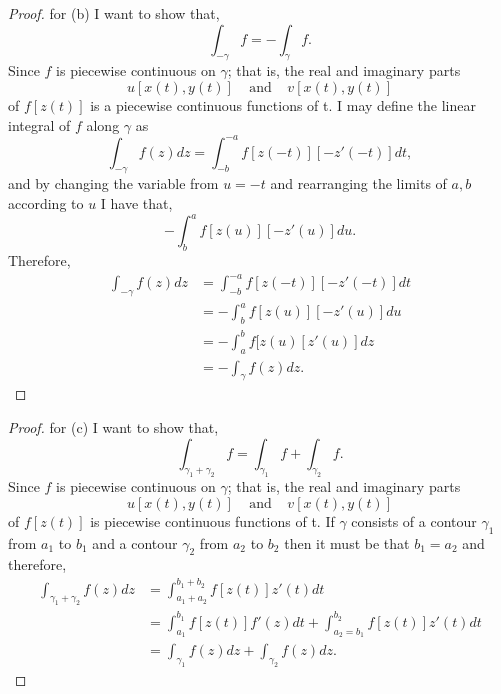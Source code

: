 \documentclass[10pt,two side,openright]{article}
\newcommand{\8}{\bar}
\begin{document}
\begin{proof}
for (b) I want to show that, 
\[ \int_{-\gamma}f = -\int_{\gamma}f. \]
Since $f$ is piecewise continuous on $\gamma$; that is, the real and imaginary parts
\[u[x(t),y(t)] \ \ \ \ \ \text{and} \ \ \ \ \ v[x(t),y(t)] \]
of $f[z(t)]$ is a piecewise continuous functions of t. I may define the linear integral of $f$ along $\gamma$ as
\[ \int_{-\gamma} f(z) dz = \int_{-b}^{-a}f[z(-t)][-z'(-t)] dt, \] 
and by changing the variable from $ u = -t$ and rearranging the limits of $a,b$ according to $u$ I have that, 
\[ -\int_{b}^{a} f[z(u)][-z'(u)]du. \] 
Therefore, 
\begin{align*}
\int_{-\gamma} f(z) dz &= \int_{-b}^{-a}f[z(-t)][-z'(-t)] dt \\
				  &= -\int_{b}^{a} f[z(u)][-z'(u)]du \\
				  &= -\int_{a}^{b} f[z(u)[z'(u)]dz \\
				  & = -\int_{\gamma} f(z) dz. 
\end{align*}
\end{proof}

\begin{proof}
for (c) I want to show that, 
\[ \int_{\gamma_{1} +\gamma_{2}} f = \int_{\gamma_{1}} f + \int_{\gamma_{2}}f. \]
Since $f$ is piecewise continuous on $\gamma$; that is, the real and imaginary parts
\[u[x(t),y(t)] \ \ \ \ \ \text{and} \ \ \ \ \ v[x(t),y(t)] \]
of $f[z(t)]$ is piecewise continuous functions of t. If $\gamma$ consists of a contour $\gamma_{1}$ from $a_{1}$ to $b_{1}$ and a contour $\gamma_{2}$ from $a_{2}$ to $b_{2}$ then it must be that $b_{1} = a_{2}$ and therefore, 
\begin{align*}
\int_{\gamma_{1} +\gamma_{2}} f(z) dz &= \int_{a_{1} + a_{2}}^{b_{1}+ b_{2}} f[z(t)]z'(t) dt\\						     
						      &=  \int_{a_{1}}^{b_{1}} f[z(t)]f'(z) dt + \int_{a_{2} = b_{1}}^{b_{2}} f[z(t)]z'(t) dt \\ 
						        &= \int_{\gamma_{1}} f(z) dz + \int_{\gamma_{2}} f(z) dz. 
						      \end{align*}
\end{proof}
\end{document}
